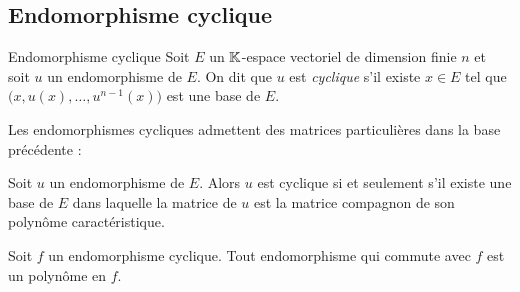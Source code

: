 \subsection{Endomorphisme cyclique}

\begin{defi}{Endomorphisme cyclique}
    Soit $E$ un $\mathbb{K}$-espace vectoriel de dimension finie $n$ et soit $u$ un endomorphisme de $E$. On dit que $u$ est \emph{cyclique} s'il existe $x \in E$ tel que $\big(x, u(x), \dots, u^{n-1}(x) \big)$ est une base de $E$. 
\end{defi}

Les endomorphismes cycliques admettent des matrices particulières dans la base précédente :

\begin{prop}{} 
    Soit $u$ un endomorphisme de $E$. Alors $u$ est cyclique si et seulement s'il existe une base de $E$ dans laquelle la matrice de $u$ est la matrice compagnon de son polynôme caractéristique.
\end{prop}

\begin{prop}{}
    Soit $f$ un endomorphisme cyclique. Tout endomorphisme qui commute avec $f$ est un polynôme en $f$.
\end{prop}

